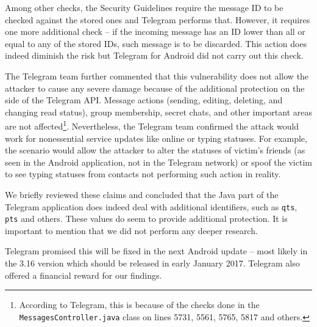 \documentclass[thesis=M,english]{FITthesis}[2012/10/20]
\begin{document}
Among other checks, the Security Guidelines require \cite{telegram-security-guideline} the message ID to be checked against the stored ones and Telegram performs that. However, it requires one more additional check -- if the incoming message has an ID lower than all or equal to any of the stored IDs, such message is to be discarded. This action does indeed diminish the risk but Telegram for Android did not carry out this check.
 
The Telegram team further commented that this vulnerability does not allow the attacker to cause any severe damage because of the additional protection on the side of the Telegram API. Message actions (sending, editing, deleting, and changing read status), group membership, secret chats, and other important areas are not affected\footnote{According to Telegram, this is because of the checks done in the \texttt{MessagesController.java} class on lines 5731, 5561, 5765, 5817 and others.}. Nevertheless, the Telegram team confirmed the attack would work for nonessential service updates like online or typing statuses. For example, the scenario would allow the attacker to alter the statuses of victim's friends (as seen in the Android application, not in the Telegram network) or spoof the victim to see typing statuses from contacts not performing such action in reality.

We briefly reviewed these claims and concluded that the Java part of the Telegram application does indeed deal with additional identifiers, such as \texttt{qts}, \texttt{pts} and others. These values do seem to provide additional protection. It is important to mention that we did not perform any deeper research.

Telegram promised this will be fixed in the next Android update -- most likely in the 3.16 version which should be released in early January 2017. Telegram also offered a financial reward for our findings.
\end{document}
